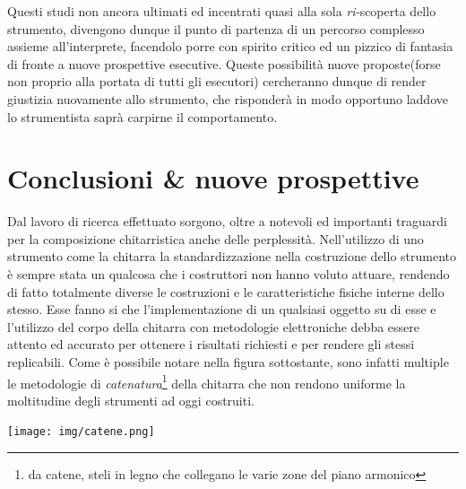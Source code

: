 \documentclass[oneside]{article}
\begin{document}
\begin{multicols*}{2}
Questi studi non ancora ultimati ed incentrati quasi alla sola \textit{ri-}scoperta dello strumento, divengono dunque il punto di partenza di un percorso complesso assieme all'interprete, facendolo porre con spirito critico ed un pizzico di fantasia di fronte a nuove prospettive esecutive. Queste possibilità nuove proposte(forse non proprio alla portata di tutti gli esecutori) cercheranno dunque di render giustizia nuovamente allo strumento, che risponderà in modo opportuno laddove lo strumentista saprà carpirne il comportamento. 


\section{ Conclusioni \& nuove prospettive}
\noindent

Dal lavoro di ricerca effettuato sorgono, oltre a notevoli ed importanti traguardi per la composizione chitarristica anche delle perplessità. 
Nell’utilizzo di uno strumento come la chitarra la standardizzazione nella costruzione dello strumento è sempre stata un qualcosa che i costruttori non hanno voluto attuare, rendendo di fatto totalmente diverse le costruzioni e le caratteristiche fisiche interne dello stesso. Esse fanno si che l'implementazione di un qualsiasi oggetto su di esse e l'utilizzo del corpo della chitarra con metodologie elettroniche debba essere attento ed accurato per ottenere i risultati richiesti e per rendere gli stessi replicabili. Come è possibile notare nella figura sottostante, sono infatti multiple le metodologie di \textit{catenatura}\footnote{da catene, steli in legno che collegano le varie zone del piano armonico} della chitarra che non rendono uniforme la moltitudine degli strumenti ad oggi costruiti.

\texttt{[image: img/catene.png]}


\end{multicols*}
\end{document}
